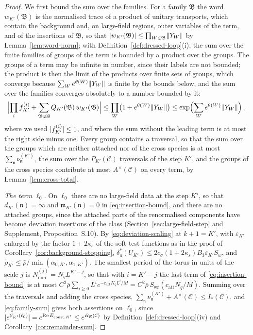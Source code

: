 \documentclass[11pt]{preprint}
\DeclarePairedDelimiter{\abs}{\lvert}{\rvert}
\DeclarePairedDelimiter{\norm}{\lVert}{\rVert}
\numberwithin{equation}{section}
\theoremstyle{definition}
\theoremstyle{remark}
\theoremstyle{plain}
\begin{document}
\begin{proof}
We first bound the sum over the families. For a family $\mathfrak B$ the word $w_{K'}(\mathfrak B)$ is the normalised trace of a product of unitary transports, which contain the background and, on large-field regions, outer variables of the term, and of the insertions of $\mathfrak B$, so that $\abs{w_{K'}(\mathfrak B)} \leq \prod_{W \in \mathfrak B}\norm{Y_W}$ by Lemma~\ref{lem:word-norm}; with Definition~\ref{def:dressed-loop}(i), the sum over the finite families of groups of the term is bounded by a product over the groups. The groups of a term may be infinite in number, since their labels are not bounded; the product is then the limit of the products over finite sets of groups, which converge because $\sum_We^{\theta(W)}\norm{Y_W}$ is finite by the bounds below, and the sum over the families converges absolutely to a number bounded by it:
\begin{equation}\label{eq:family-sum}
    \Bigl\lvert\prod_if^{(i)}_{K'} + \sum_{\mathfrak B \neq \emptyset}Q_{K'}(\mathfrak B)\,w_{K'}(\mathfrak B)\Bigr\rvert \leq \prod_W\bigl(1 + e^{\theta(W)}\norm{Y_W}\bigr) \leq \exp\Bigl(\sum_We^{\theta(W)}\norm{Y_W}\Bigr)\;,
\end{equation}
where we used $\abs{f^{(i)}_{K'}} \leq 1$, and where the sum without the leading term is at most the right side minus one. Every group contains a traversal, so that the sum over the groups which are neither attached nor of the cross species is at most $\sum_{\mathfrak n}\nu^{(K')}_{\mathfrak n}$, the sum over the $P_{K'}(\mathcal C)$ traversals of the step $K'$, and the groups of the cross species contribute at most $A^\times(\mathcal C)$ on every term, by Lemma~\ref{lem:cross-total}.

\emph{The term $\ell_0$.} On $\ell_0$ there are no large-field data at the step $K'$, so that $d_{K'}(\mathfrak n) = \infty$ and $\mathfrak m_{K'}(\mathfrak n) = 0$ in \eqref{eq:insertion-bound}, and there are no attached groups, since the attached parts of the renormalised components have become deviation insertions of the class (Section~\ref{sec:large-field-step} and Supplement, Proposition~S.10). By \eqref{eq:deviation-scaling} at $k + 1 = K'$, with $\varepsilon_{K'}$ enlarged by the factor $1 + 2\kappa_s$ of the soft test functions as in the proof of Corollary~\ref{cor:background-stopping}, $\delta^*_{\mathfrak n}(U_{K'}) \leq 2c_\sigma(1 + 2\kappa_s)B_3\varepsilon_{K'}S_w$, and $\tilde\rho_{K'} \leq \bar\rho/\min(\alpha_{0,K'}, \alpha_{1,K'})$. The smallest period of the torus in units of the scale $j$ is $N^{(j)}_{\min} = N_qL^{K'-j}$, so that with $i = K' - j$ the last term of \eqref{eq:insertion-bound} is at most $C^2\bar\rho\sum_{i \geq 0}L^ie^{-c_{\mathrm{att}}N_qL^i/M} = C^2\bar\rho\,S_{\mathrm{wr}}(c_{\mathrm{att}}N_q/M)$. Summing over the traversals and adding the cross species, $\sum_{\mathfrak n}\nu^{(K')}_{\mathfrak n} + A^\times(\mathcal C) \leq I_*(\mathcal C)$, and \eqref{eq:family-sum} gives both assertions on $\ell_0$, since $\abs{e^{\mathcal E_{K'}(\ell_0)}} = e^{\operatorname{Re}E_{\mathrm{const},K'}} \leq e^{B_E(\mathcal C)}$ by Definition~\ref{def:dressed-loop}(iv) and Corollary~\ref{cor:remainder-sum}.


\end{proof}
\end{document}

